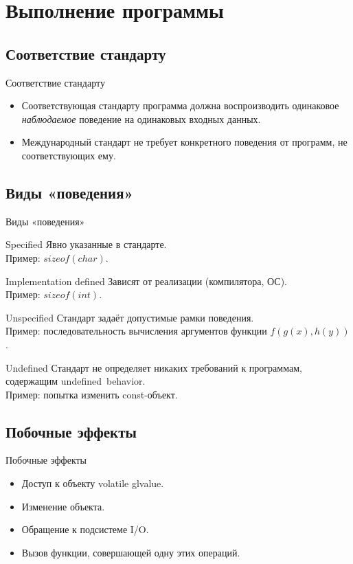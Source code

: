    \section{Выполнение программы}
    \subsection{Соответствие стандарту}
    \begin{frame}{Соответствие стандарту}
        \begin{itemize}
            \item Соответствующая стандарту программа должна воспроизводить одинаковое \textit{наблюдаемое} поведение
                на одинаковых входных данных.
            \item Международный стандарт не требует конкретного поведения от программ, не соответствующих ему.
        \end{itemize}
    \end{frame}
    \subsection{Виды «поведения»}
    \begin{frame}{Виды «поведения»}
        \begin{block}{Specified}
            Явно указанные в стандарте. \\
            Пример: $sizeof(char)$.
        \end{block}
        \begin{block}{Implementation defined}
            Зависят от реализации (компилятора, ОС). \\
            Пример: $sizeof(int)$.
        \end{block}
        \begin{block}{Unspecified}
            Стандарт задаёт допустимые рамки поведения. \\
            Пример: последовательность вычисления аргументов функции $f(g(x), h(y))$.
        \end{block}
        \begin{block}{Undefined}
            Стандарт не определяет никаких требований к программам, содержащим undefined~behavior. \\
            Пример: попытка изменить const-объект.
        \end{block}
    \end{frame}
    \subsection{Побочные эффекты}
    \begin{frame}{Побочные эффекты}
        \begin{itemize}
            \item Доступ к объекту volatile glvalue.
            \item Изменение объекта.
            \item Обращение к подсистеме I/O.
            \item Вызов функции, совершающей одну этих операций.
        \end{itemize}
    \end{frame}
